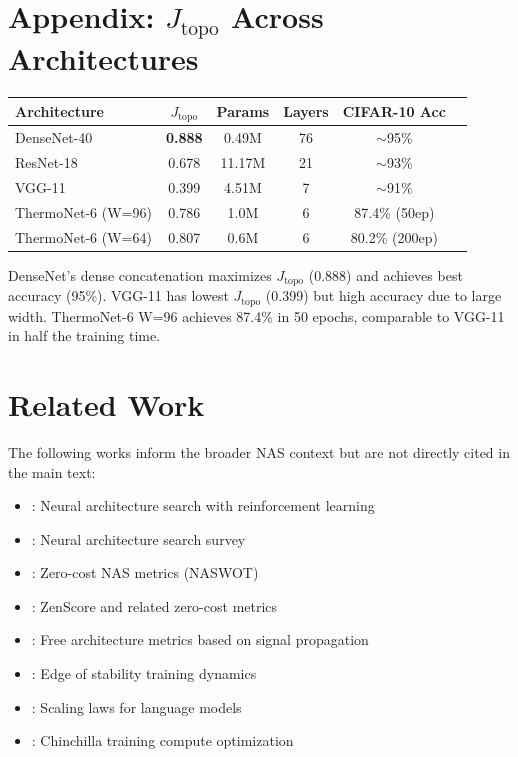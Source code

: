 \documentclass[11pt, a4paper]{article}
\theoremstyle{plain}
\begin{document}
\section*{Appendix: $J_{\mathrm{topo}}$ Across Architectures}

\begin{center}
\begin{tabular}{lccccc}
\toprule
Architecture & $J_{\mathrm{topo}}$ & Params & Layers & CIFAR-10 Acc \\
\midrule
DenseNet-40 & \textbf{0.888} & 0.49M & 76 & $\sim$95\% \\
ResNet-18 & 0.678 & 11.17M & 21 & $\sim$93\% \\
VGG-11 & 0.399 & 4.51M & 7 & $\sim$91\% \\
ThermoNet-6 (W=96) & 0.786 & 1.0M & 6 & 87.4\% (50ep) \\
ThermoNet-6 (W=64) & 0.807 & 0.6M & 6 & 80.2\% (200ep) \\
\bottomrule
\end{tabular}
\end{center}

DenseNet's dense concatenation maximizes $J_{\mathrm{topo}}$ (0.888) and achieves best accuracy (95\%). VGG-11 has lowest $J_{\mathrm{topo}}$ (0.399) but high accuracy due to large width. ThermoNet-6 W=96 achieves 87.4\% in 50 epochs, comparable to VGG-11 in half the training time.




\section*{Related Work}

The following works inform the broader NAS context but are not directly cited in the main text:

\begin{itemize}
\item \citet{zoph2016neural}: Neural architecture search with reinforcement learning
\item \citet{elsken2019neural}: Neural architecture search survey
\item \citet{abdelfattah2021no}: Zero-cost NAS metrics (NASWOT)
\item \citet{zhai2019nas}: ZenScore and related zero-cost metrics
\item \citet{shu2022free}: Free architecture metrics based on signal propagation
\item \citet{cohen2021theory}: Edge of stability training dynamics
\item \citet{kaplan2020scaling}: Scaling laws for language models
\item \citet{hoffmann2022training}: Chinchilla training compute optimization
\end{itemize}
\end{document}
